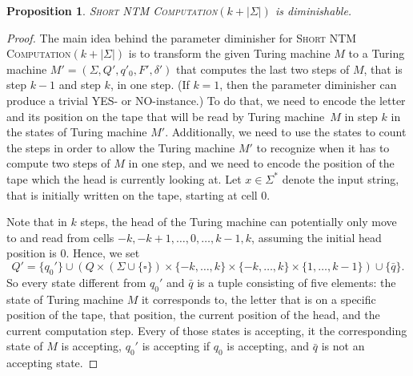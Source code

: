\documentclass[11pt,a4,USenglish]{article}
\newcommand{\prob}[1]{\textsc{#1}}
\newcommand{\pprob}[2]{\prob{#1}$(#2)$}
\newcommand{\YES}{YES}
\newcommand{\NO}{NO}
\theoremstyle{definition}
\theoremstyle{plain}
\newtheorem{proposition}{Proposition}
\theoremstyle{remark}
\begin{document}
\begin{proposition}%
\label{prop:shortntmc}
\pprob{Short NTM Computation}{k+|\Sigma|} is diminishable.
\end{proposition}
%
%
{
  \begin{proof}
  The main idea behind the parameter diminisher for \pprob{Short NTM Computation}{k+|\Sigma|} is to transform the given Turing machine $M$ to a Turing machine $M'=(\Sigma,Q',q'_0,F',\delta')$ that computes the last two steps of $M$, that is step $k-1$ and step $k$, in one step. 
  (If $k=1$, then the parameter diminisher can produce a trivial \YES{}- or \NO-instance.) 
  To do that, we need to encode the letter and its position on the tape that will be read by Turing machine~$M$ in step $k$ in the states of Turing machine $M'$. 
  Additionally, we need to use the states to count the steps in order to allow the Turing machine $M'$ to recognize when it has to compute two steps of $M$ in one step, and we need to encode the position of the tape which the head is currently looking at. Let $x\in \Sigma^*$ denote the input string, that is initially written on the tape, starting at cell $0$.

  Note that in $k$ steps, the head of the Turing machine can potentially only move to and read from cells $-k, -k+1, \ldots, 0, \ldots, k-1, k$, assuming the initial head position is $0$. Hence, we set 
  $$Q' = \{q_0'\}\cup (Q\times (\Sigma\cup \{\square\})\times\{-k,\dots,k\}\times\{-k,\dots,k\}\times\{1,\dots,k-1\})\cup \{\bar{q}\}.$$ 
  So every state different from $q_0'$ and $\bar{q}$ is a tuple consisting of five elements: the state of Turing machine $M$ it corresponds to, the letter that is on a specific position of the tape, that position, the current position of the head, and the current computation step. Every of those states is accepting, it the corresponding state of $M$ is accepting, $q_0'$ is accepting if $q_0$ is accepting, and $\bar{q}$ is not an accepting state.


\end{proof}}
\end{document}
